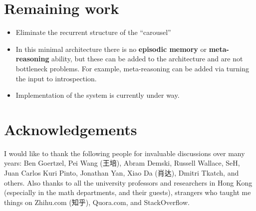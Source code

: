\documentclass[orivec]{llncs}
\begin{document}



\section{Remaining work}


\begin{itemize}
	\item Eliminate the recurrent structure of the ``carousel''
	\item In this minimal architecture there is no \textbf{episodic memory} or \textbf{meta-reasoning} ability, but these can be added to the architecture and are not bottleneck problems.  For example, meta-reasoning can be added via turning the input to introspection.
	\item Implementation of the system is currently under way.
\end{itemize}

\section*{Acknowledgements}

I would like to thank the following people for invaluable discussions over many years:  Ben Goertzel, Pei Wang (王培), Abram Demski, Russell Wallace, SeH, Juan Carlos Kuri Pinto, Jonathan Yan, Xiao Da (肖达), Dmitri Tkatch, and others.  Also thanks to all the university professors and researchers in Hong Kong (especially in the math departments, and their guests), strangers who taught me things on Zhihu.com (知乎), Quora.com, and StackOverflow.


\end{document}
